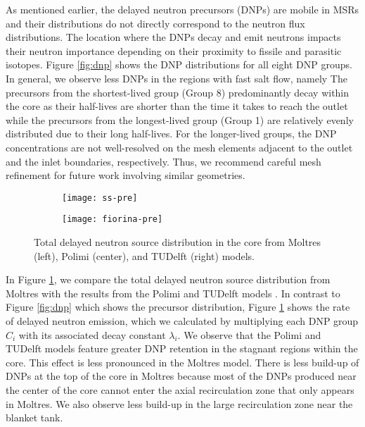 As mentioned earlier, the delayed neutron precursors (DNPs) are mobile in
\glspl{MSR} and their distributions do not directly correspond to the neutron
flux distributions. The location where the \glspl{DNP} decay and emit neutrons
impacts their neutron
importance depending on their proximity to fissile and parasitic isotopes.
Figure \ref{fig:dnp} shows the \gls{DNP} distributions for all eight \gls{DNP}
groups. In general, we observe less \glspl{DNP} in the regions with fast salt
flow, namely
 The
precursors from the shortest-lived group (Group 8) predominantly decay within
the core as their half-lives are shorter than the time it takes to reach the
outlet while the precursors from the longest-lived group (Group 1) are
relatively evenly distributed due to their long half-lives. For the
longer-lived groups, the \gls{DNP} concentrations are not well-resolved on the
mesh elements adjacent to the outlet and the inlet boundaries, respectively.
Thus, we recommend careful mesh refinement for future work involving similar
geometries.

\begin{figure}[b!]
    \centering
    \begin{subfigure}[t]{.30\textwidth}
        \centering
        \vspace{.9cm}
        \texttt{[image: ss-pre]}
    \end{subfigure}
    \begin{subfigure}[t]{.69\textwidth}
        \centering
        \vspace{0pt}
        \texttt{[image: fiorina-pre]}
    \end{subfigure}
    \caption{Total delayed neutron source distribution in the core from
    Moltres (left), Polimi (center), and TUDelft (right) models.}
    \label{fig:pre}
\end{figure}

In Figure \ref{fig:pre}, we compare the total delayed neutron source
distribution from Moltres with the results from the Polimi and TUDelft models
\cite{fiorina_modelling_2014}. In contrast to Figure \ref{fig:dnp} which shows
the precursor distribution, Figure \ref{fig:pre} shows the rate of delayed
neutron emission, which we calculated by multiplying each \gls{DNP} group
$C_i$ with its associated decay constant $\lambda_i$.
We observe that the Polimi and TUDelft models
feature greater \gls{DNP} retention in the stagnant regions within the core.
This effect is less pronounced in the Moltres model. There is less build-up
of \glspl{DNP} at the top of the core in Moltres because most of the
\glspl{DNP} produced near the center of the core cannot enter the axial
recirculation zone that only appears in Moltres. We also observe less build-up
in the large recirculation zone near the blanket tank.

